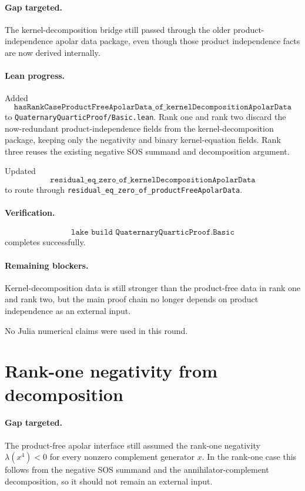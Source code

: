 \documentclass[11pt]{article}
\begin{document}
\paragraph{Gap targeted.}
The kernel-decomposition bridge still passed through the older
product-independence apolar data package, even though those product
independence facts are now derived internally.

\paragraph{Lean progress.}
Added
\[
\texttt{hasRankCaseProductFreeApolarData\_of\_kernelDecompositionApolarData}
\]
to \texttt{QuaternaryQuarticProof/Basic.lean}.  Rank one and rank two discard
the now-redundant product-independence fields from the kernel-decomposition
package, keeping only the negativity and binary kernel-equation fields.  Rank
three reuses the existing negative SOS summand and decomposition argument.

Updated
\[
\texttt{residual\_eq\_zero\_of\_kernelDecompositionApolarData}
\]
to route through \texttt{residual\_eq\_zero\_of\_productFreeApolarData}.

\paragraph{Verification.}
\[
\texttt{lake build QuaternaryQuarticProof.Basic}
\]
completes successfully.

\paragraph{Remaining blockers.}
Kernel-decomposition data is still stronger than the product-free data in rank
one and rank two, but the main proof chain no longer depends on product
independence as an external input.

No Julia numerical claims were used in this round.

\section*{Rank-one negativity from decomposition}

\paragraph{Gap targeted.}
The product-free apolar interface still assumed the rank-one negativity
\(\lambda(x^4)<0\) for every nonzero complement generator \(x\).  In the
rank-one case this follows from the negative SOS summand and the
annihilator-complement decomposition, so it should not remain an external
input.
\end{document}
